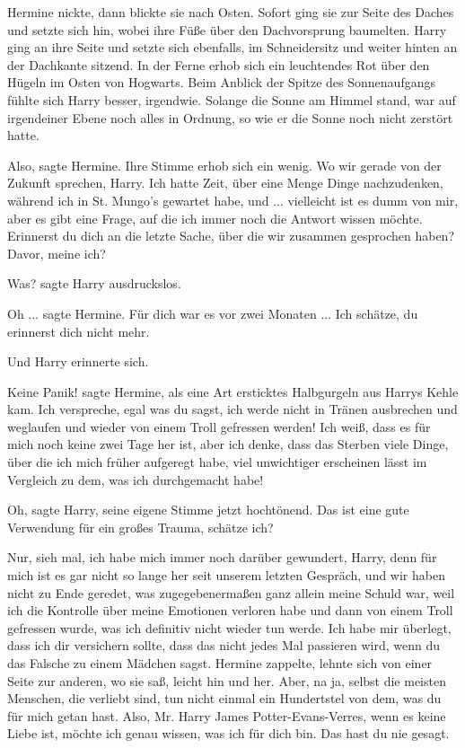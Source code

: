 Hermine nickte, dann blickte sie nach Osten. Sofort ging sie zur Seite des
Daches und setzte sich hin, wobei ihre Füße über den Dachvorsprung baumelten.
Harry ging an ihre Seite und setzte sich ebenfalls, im Schneidersitz und weiter
hinten an der Dachkante sitzend. In der Ferne erhob sich ein leuchtendes Rot
über den Hügeln im Osten von Hogwarts. Beim Anblick der Spitze des
Sonnenaufgangs fühlte sich Harry besser, irgendwie. Solange die Sonne am Himmel
stand, war auf irgendeiner Ebene noch alles in Ordnung, so wie er die Sonne noch
nicht zerstört hatte.

\glqq{}Also\grqq{}, sagte Hermine. Ihre Stimme erhob sich ein wenig. \glqq{}Wo wir
gerade von der Zukunft sprechen, Harry. Ich hatte Zeit, über eine Menge Dinge
nachzudenken, während ich in St. Mungo's gewartet habe, und ... vielleicht ist
es dumm von mir, aber es gibt eine Frage, auf die ich immer noch die Antwort
wissen möchte. Erinnerst du dich an die letzte Sache, über die wir zusammen
gesprochen haben? Davor, meine ich?\grqq{}

\glqq{}Was?\grqq{} sagte Harry ausdruckslos.

\glqq{}Oh ...\grqq{} sagte Hermine. \glqq{}Für dich war es vor zwei Monaten ... Ich
schätze, du erinnerst dich nicht mehr.\grqq{}

Und Harry erinnerte sich.

\glqq{}Keine Panik!\grqq{} sagte Hermine, als eine Art ersticktes Halbgurgeln aus
Harrys Kehle kam. \glqq{}Ich verspreche, egal was du sagst, ich werde nicht in
Tränen ausbrechen und weglaufen und wieder von einem Troll gefressen werden! Ich
weiß, dass es für mich noch keine zwei Tage her ist, aber ich denke, dass das
Sterben viele Dinge, über die ich mich früher aufgeregt habe, viel unwichtiger
erscheinen lässt im Vergleich zu dem, was ich durchgemacht habe!\grqq{}

\glqq{}Oh\grqq{}, sagte Harry, seine eigene Stimme jetzt hochtönend. \glqq{}Das
ist eine gute Verwendung für ein großes Trauma, schätze ich?\grqq{}

\glqq{}Nur, sieh mal, ich habe mich immer noch darüber gewundert, Harry, denn für
mich ist es gar nicht so lange her seit unserem letzten Gespräch, und wir haben
nicht zu Ende geredet, was zugegebenermaßen ganz allein meine Schuld war, weil
ich die Kontrolle über meine Emotionen verloren habe und dann von einem Troll
gefressen wurde, was ich definitiv nicht wieder tun werde. Ich habe mir
überlegt, dass ich dir versichern sollte, dass das nicht jedes Mal passieren
wird, wenn du das Falsche zu einem Mädchen sagst.\grqq{} Hermine zappelte, lehnte sich
von einer Seite zur anderen, wo sie saß, leicht hin und her. \glqq{}Aber, na ja,
selbst die meisten Menschen, die verliebt sind, tun nicht einmal ein Hundertstel
von dem, was du für mich getan hast. Also, Mr. Harry James Potter-Evans-Verres,
wenn es keine Liebe ist, möchte ich genau wissen, was ich für dich bin. Das hast
du nie gesagt.\grqq{}

